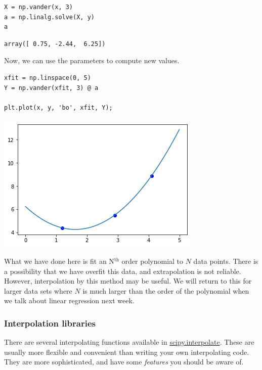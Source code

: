 \documentclass[11pt]{article}
\begin{document}
\begin{verbatim}
X = np.vander(x, 3)
a = np.linalg.solve(X, y)
a
\end{verbatim}

\begin{verbatim}
array([ 0.75, -2.44,  6.25])
\end{verbatim}

Now, we can use the parameters to compute new values.

\begin{verbatim}
xfit = np.linspace(0, 5)
Y = np.vander(xfit, 3) @ a

plt.plot(x, y, 'bo', xfit, Y);
\end{verbatim}

\begin{center}
\includegraphics[width=.9\linewidth]{obipy-resources/e021eb5cde8c0f560ad245cab4a1f678-5592994o.png}
\end{center}

What we have done here is fit an N\(^{\text{th}}\) order polynomial to \(N\) data points. There is a possibility that we have overfit this data, and extrapolation is not reliable. However, interpolation by this method may be useful. We will return to this for larger data sets where \(N\) is much larger than the order of the polynomial when we talk about linear regression next week.

\subsubsection{Interpolation libraries}
\label{sec:org3b7b69b}

There are several interpolating functions available in \href{https://docs.scipy.org/doc/scipy/reference/interpolate.html}{scipy.interpolate}. These are usually more flexible and convenient than writing your own interpolating code. They are more sophisticated, and have some \emph{features} you should be aware of.
\end{document}
